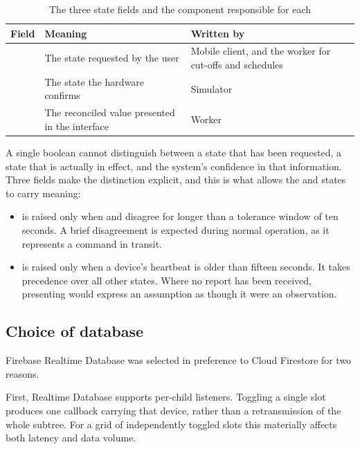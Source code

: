 \documentclass[11pt,a4paper]{article}
\begin{document}
\begin{table}[h]
\centering
\caption{The three state fields and the component responsible for each}
\label{tab:threefields}
\begin{tabular}{@{}L{3.2cm}L{5.6cm}L{5.4cm}@{}}
\toprule
\textbf{Field} & \textbf{Meaning} & \textbf{Written by} \\
\midrule
{}  & The state requested by the user & Mobile client, and the worker for cut-offs and schedules \\
 & The state the hardware confirms & Simulator \\
        & The reconciled value presented in the interface & Worker \\
\bottomrule
\end{tabular}
\end{table}

A single boolean cannot distinguish between a state that has been requested, a
state that is actually in effect, and the system's confidence in that
information. Three fields make the distinction explicit, and this is what allows
the  and  states to carry meaning:

\begin{itemize}
  \item {} is raised only when  and
         disagree for longer than a tolerance window of ten
        seconds. A brief disagreement is expected during normal operation, as it
        represents a command in transit.
  \item {} is raised only when a device's heartbeat is older
        than fifteen seconds. It takes precedence over all other states. Where
        no report has been received, presenting  would express an
        assumption as though it were an observation.
\end{itemize}

\subsection{Choice of database}

Firebase Realtime Database was selected in preference to Cloud Firestore for two
reasons.

First, Realtime Database supports per-child listeners. Toggling a single slot
produces one  callback carrying that device, rather than a
retransmission of the whole  subtree. For a grid of independently
toggled slots this materially affects both latency and data volume.
\end{document}
